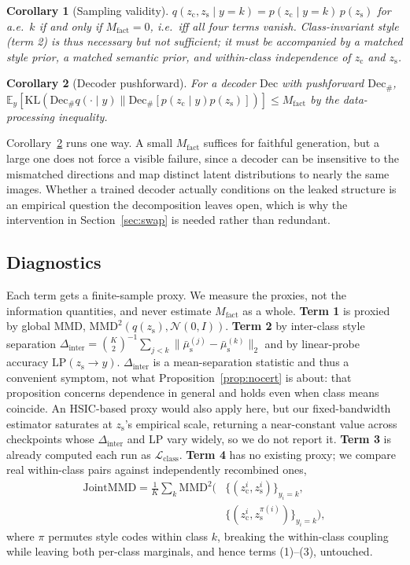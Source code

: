 \documentclass[letterpaper]{article} %
\newtheorem{corollary}{Corollary}
\newcommand{\zc}{z_{\mathrm{c}}}
\newcommand{\zs}{z_{\mathrm{s}}}
\newcommand{\mus}{\mu_{\mathrm{s}}}
\newcommand{\MMD}{\mathrm{MMD}}
\newcommand{\KL}{\mathrm{KL}}
\newcommand{\Dinter}{\Delta_{\mathrm{inter}}}
\begin{document}
\begin{corollary}[Sampling validity]
\label{cor:valid}
$q(\zc,\zs\mid y{=}k)=p(\zc\mid y{=}k)\,p(\zs)$ for a.e.\ $k$ if and only if
$M_{\mathrm{fact}}=0$, i.e.\ iff all four terms vanish. Class-invariant style
(term 2) is thus necessary but not sufficient; it must be accompanied by a
matched style prior, a matched semantic prior, and within-class independence
of $\zc$ and $\zs$.
\end{corollary}

\begin{corollary}[Decoder pushforward]
\label{cor:push}
For a decoder $\mathrm{Dec}$ with pushforward $\mathrm{Dec}_\#$,
$\mathbb E_y[\KL(\mathrm{Dec}_\# q(\cdot\mid y)\|\mathrm{Dec}_\#[p(\zc\mid
y)p(\zs)])] \le M_{\mathrm{fact}}$ by the data-processing inequality.
\end{corollary}

Corollary~\ref{cor:push} runs one way. A small $M_{\mathrm{fact}}$ suffices
for faithful generation, but a large one does not force a visible failure,
since a decoder can be insensitive to the mismatched directions and map
distinct latent distributions to nearly the same images. Whether a trained
decoder actually conditions on the leaked structure is an empirical question
the decomposition leaves open, which is why the intervention in
Section~\ref{sec:swap} is needed rather than redundant.

\subsection{Diagnostics}
\label{sec:diag}

Each term gets a finite-sample proxy. We measure the proxies, not the
information quantities, and never estimate $M_{\mathrm{fact}}$ as a whole.
\textbf{Term 1} is proxied by global MMD, $\MMD^2(q(\zs),\mathcal N(0,I))$.
\textbf{Term 2} by inter-class style separation
$\Dinter=\binom{K}{2}^{-1}\sum_{j<k}\|\bar\mus^{(j)}-\bar\mus^{(k)}\|_2$ and
by linear-probe accuracy $\mathrm{LP}(\zs\to y)$. $\Dinter$ is a
mean-separation statistic and thus a convenient symptom, not what
Proposition~\ref{prop:nocert} is about: that proposition concerns dependence
in general and holds even when class means coincide. An HSIC-based proxy
would also apply here, but our fixed-bandwidth estimator saturates at $\zs$'s
empirical scale, returning a near-constant value across checkpoints whose
$\Dinter$ and LP vary widely, so we do not report it. \textbf{Term 3} is
already computed each run as $\mathcal L_{\mathrm{class}}$. \textbf{Term 4}
has no existing proxy; we compare real within-class pairs against
independently recombined ones,
\begin{equation}
\begin{split}
\mathrm{JointMMD} = \tfrac1K\textstyle\sum_k \MMD^2\bigl(&\{(\zc^i,\zs^i)\}_{y_i=k},\\
&\{(\zc^i,\zs^{\pi(i)})\}_{y_i=k}\bigr),
\end{split}
\label{eq:jmmd}
\end{equation}
where $\pi$ permutes style codes within class $k$, breaking the within-class
coupling while leaving both per-class marginals, and hence terms (1)--(3),
untouched.
\end{document}
